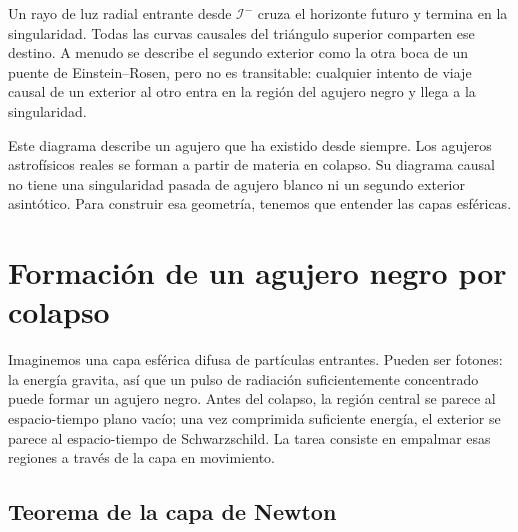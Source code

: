 Un rayo de luz radial entrante desde \(\mathcal{I}^-\) cruza el horizonte futuro y termina en la singularidad. Todas las curvas causales del triángulo superior comparten ese destino. A menudo se describe el segundo exterior como la otra boca de un puente de Einstein--Rosen, pero no es transitable: cualquier intento de viaje causal de un exterior al otro entra en la región del agujero negro y llega a la singularidad.

\begin{classroomqa}
\end{classroomqa}

Este diagrama describe un agujero que ha existido desde siempre. Los agujeros astrofísicos reales se forman a partir de materia en colapso. Su diagrama causal no tiene una singularidad pasada de agujero blanco ni un segundo exterior asintótico. Para construir esa geometría, tenemos que entender las capas esféricas.

\section{Formación de un agujero negro por colapso}

Imaginemos una capa esférica difusa de partículas entrantes. Pueden ser fotones: la energía gravita, así que un pulso de radiación suficientemente concentrado puede formar un agujero negro. Antes del colapso, la región central se parece al espacio-tiempo plano vacío; una vez comprimida suficiente energía, el exterior se parece al espacio-tiempo de Schwarzschild. La tarea consiste en empalmar esas regiones a través de la capa en movimiento.

\subsection{Teorema de la capa de Newton}

